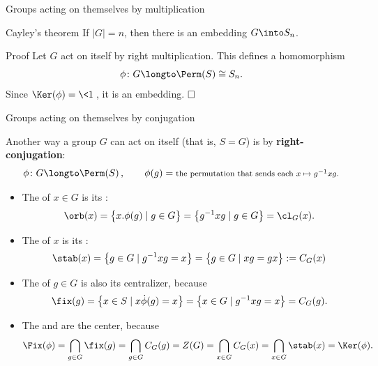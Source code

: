 \documentclass[8pt, handout]{beamer}
\newcommand{\Pause}{}      %
\begin{document}
\begin{frame}{Groups acting on themselves by multiplication}
  \vspace{-1mm}\Pause
  
  \begin{block}{Cayley's theorem}
    If $|G|=n$, then there is an embedding $G\into S_n$.
  \end{block}
  
  \begin{exampleblock}{Proof} \Pause
    Let $G$ act on itself by right multiplication. \Pause This defines
    a homomorphism 
    \[
    \phi\colon G\longto\Perm(S)\cong S_n.
    \]
    \Pause Since $\Ker(\phi)=\<1\>$, it is an embedding. $\hfill\Box$
  \end{exampleblock}
  
\end{frame}


\begin{frame}{Groups acting on themselves by conjugation}

  Another way a group $G$ can act on itself (that is, $S=G$) is by
  \textbf{right-conjugation}:
  \[
  \phi\colon G\longto\Perm(S)\,,\qquad \phi(g)=\mbox{\footnotesize the
    permutation that sends each $x\mapsto g^{-1}xg$.}
  \]

  \Pause

  \begin{itemize}
  \item The  of $x\in G$ is its : %
    \[
    \orb(x)=\big\{x.\phi(g)\mid g\in G\big\}\Pause=\big\{g^{-1}xg\mid
    g\in G\big\} \Pause=\cl_G(x).
    \]
    \vspace{-3mm}\Pause
  \item The  of $x$ is its : 
    \[
    \stab(x)=\big\{g\in G\mid g^{-1}xg=x\big\}\Pause
    =\big\{g\in G\mid xg=gx\big\}:=C_G(x)
    \]
    \vspace{-3mm}\Pause
  \item The  of $g\in G$ is
    also its centralizer, because
    \[
    \fix(g)=\big\{x\in S\mid x\Dot\phi(g)=x\big\}\Pause=\big\{x\in G\mid
    g^{-1}xg=x\big\}\Pause=C_G(g).
    \]
    \vspace{-3mm}\Pause
  \item The  and  are the
    center, because
    \[
    \Fix(\phi)=\bigcap_{g\in G}\fix(g)\Pause=\bigcap_{g\in G}C_G(g)\Pause=Z(G)
    \Pause=\bigcap_{x\in G}C_G(x)\Pause=\bigcap_{x\in G}\stab(x)\Pause=\Ker(\phi).
    \]
  \end{itemize}
  
\end{frame}
\end{document}
